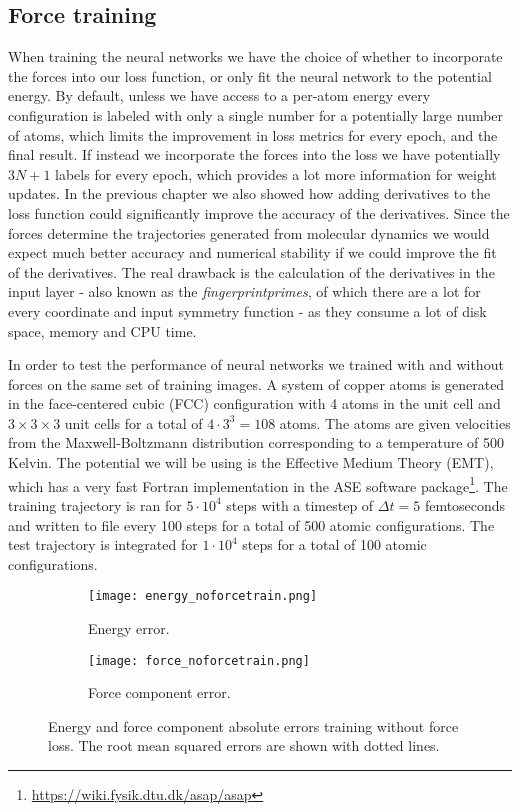 \subsection{Force training}
When training the neural networks we have the choice of whether
to incorporate the forces into our loss function, or only fit
the neural network to the potential energy. By default, unless
we have access to a per-atom energy every configuration is labeled
with only a single number for a potentially large number of atoms,
which limits the improvement in loss metrics for every epoch,
and the final result. If instead we incorporate the forces into the
loss we have potentially $3N + 1$ labels for every epoch,
which provides a lot more information for weight updates.
In the previous chapter we also showed how adding derivatives to
the loss function could significantly improve the accuracy of the
derivatives. Since the forces determine the trajectories generated
from molecular dynamics we would expect much better
accuracy and numerical stability if we could improve the fit of
the derivatives.
The real drawback is the calculation of the derivatives in the input layer - 
also known as the \textit{fingerprintprimes},
of which there are a lot for every coordinate
and input symmetry function - as they consume a lot of disk space,
memory and CPU time.
\par
In order to test the performance of neural networks
we trained with and without forces on the same set of training images.
A system of copper atoms is generated in the face-centered cubic (FCC)
configuration with 4 atoms in the unit cell and $3 \times 3 \times 3$
unit cells for a total of $4 \cdot 3^3 = 108$ atoms. The
atoms are given velocities from the Maxwell-Boltzmann distribution
corresponding to a temperature of 500 Kelvin. The potential we will
be using is the Effective Medium Theory (EMT), which has a very
fast Fortran implementation in the ASE software package\footnote{
\url{https://wiki.fysik.dtu.dk/asap/asap}}.
The training trajectory is ran for $5 \cdot 10^4$ steps with
a timestep of $\Delta t = 5$ femtoseconds and written to file every 100 steps
for a total of 500 atomic configurations. The test trajectory is
integrated for $1 \cdot 10^4$ steps for a total of 100 atomic configurations.

\begin{figure}[H]
\begin{adjustbox}{max width=1.2\linewidth,center}
\centering
  \begin{subfigure}[b]{0.55\textwidth}
      \texttt{[image: energy\_noforcetrain.png]}
      \caption{Energy error.}
    \label{fig:f1}
  \end{subfigure}
  \hfill
  \begin{subfigure}[b]{0.55\textwidth}
      \texttt{[image: force\_noforcetrain.png]}
      \caption{Force component error.}
    \label{fig:f2}
  \end{subfigure}
\end{adjustbox}
\caption{Energy and force component absolute errors training without
    force loss. The root mean squared errors are shown with dotted lines.}
    \label{fig:noforcetrain}
\end{figure}

